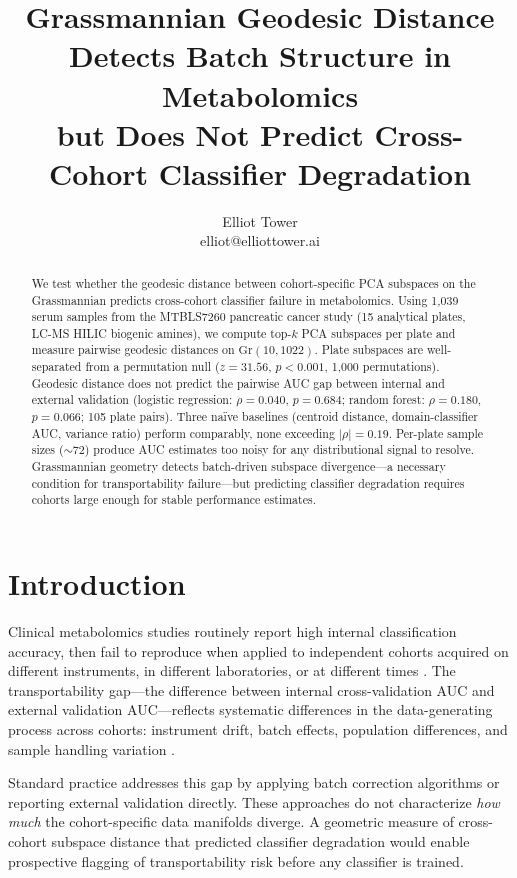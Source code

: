 \documentclass{article}
\title{Grassmannian Geodesic Distance Detects Batch Structure in Metabolomics\\but Does Not Predict Cross-Cohort Classifier Degradation}
\author{\name Elliot Tower \\
      \email elliot@elliottower.ai}
\begin{document}
\maketitle

\begin{abstract}
We test whether the geodesic distance between cohort-specific PCA subspaces on the Grassmannian predicts cross-cohort classifier failure in metabolomics. Using 1{,}039 serum samples from the MTBLS7260 pancreatic cancer study (15 analytical plates, LC-MS HILIC biogenic amines), we compute top-$k$ PCA subspaces per plate and measure pairwise geodesic distances on $\mathrm{Gr}(10, 1022)$. Plate subspaces are well-separated from a permutation null ($z = 31.56$, $p < 0.001$, 1{,}000 permutations). Geodesic distance does not predict the pairwise AUC gap between internal and external validation (logistic regression: $\rho = 0.040$, $p = 0.684$; random forest: $\rho = 0.180$, $p = 0.066$; 105 plate pairs). Three na\"{i}ve baselines (centroid distance, domain-classifier AUC, variance ratio) perform comparably, none exceeding $|\rho| = 0.19$. Per-plate sample sizes ($\sim$72) produce AUC estimates too noisy for any distributional signal to resolve. Grassmannian geometry detects batch-driven subspace divergence---a necessary condition for transportability failure---but predicting classifier degradation requires cohorts large enough for stable performance estimates.
\end{abstract}

\section{Introduction}

Clinical metabolomics studies routinely report high internal classification accuracy, then fail to reproduce when applied to independent cohorts acquired on different instruments, in different laboratories, or at different times \citep{broadhurst2006statistical}. The transportability gap---the difference between internal cross-validation AUC and external validation AUC---reflects systematic differences in the data-generating process across cohorts: instrument drift, batch effects, population differences, and sample handling variation \citep{wehrens2016improved}.

Standard practice addresses this gap by applying batch correction algorithms \citep{johnson2007adjusting} or reporting external validation directly. These approaches do not characterize \emph{how much} the cohort-specific data manifolds diverge. A geometric measure of cross-cohort subspace distance that predicted classifier degradation would enable prospective flagging of transportability risk before any classifier is trained.
\end{document}
